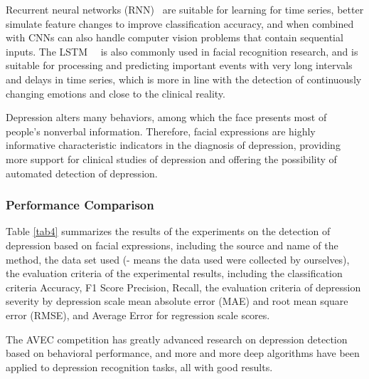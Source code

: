 Recurrent neural networks (RNN)~\cite{8466881} are suitable for learning for time series, better simulate feature changes to improve classification accuracy, and when combined with CNNs can also handle computer vision problems that contain sequential inputs. The LSTM~\cite{2017Exploring}~\cite{2020Automatic2} is also commonly used in facial recognition research, and is suitable for processing and predicting important events with very long intervals and delays in time series, which is more in line with the detection of continuously changing emotions and close to the clinical reality.

Depression alters many behaviors, among which the face presents most of people's nonverbal information. Therefore, facial expressions are highly informative characteristic indicators in the diagnosis of depression, providing more support for clinical studies of depression and offering the possibility of automated detection of depression.


\subsubsection{Performance Comparison}
Table \ref{tab4} summarizes the results of the experiments on the detection of depression based on facial expressions, including the source and name of the method, the data set used (- means the data used were collected by ourselves), the evaluation criteria of the experimental results, including the classification criteria Accuracy, F1 Score Precision, Recall, the evaluation criteria of depression severity by depression scale mean absolute error (MAE) and root mean square error (RMSE), and Average Error for regression scale scores.

The AVEC competition has greatly advanced research on depression detection based on behavioral performance, and more and more deep algorithms have been applied to depression recognition tasks, all with good results.


